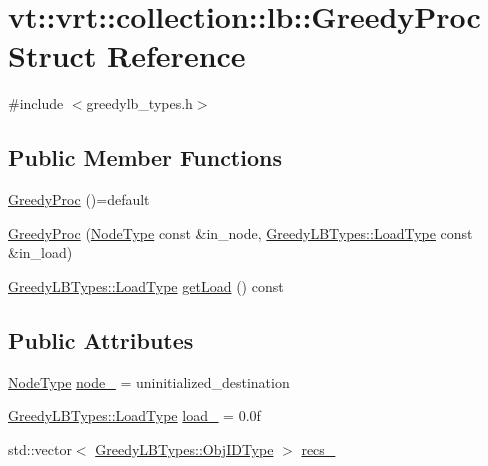 \hypertarget{structvt_1_1vrt_1_1collection_1_1lb_1_1_greedy_proc}{}\section{vt\+:\+:vrt\+:\+:collection\+:\+:lb\+:\+:Greedy\+Proc Struct Reference}
\label{structvt_1_1vrt_1_1collection_1_1lb_1_1_greedy_proc}


{\ttfamily \#include $<$greedylb\+\_\+types.\+h$>$}

\subsection*{Public Member Functions}
\begin{DoxyCompactItemize}
\item 
\hyperlink{structvt_1_1vrt_1_1collection_1_1lb_1_1_greedy_proc_acbbebf3b853047385b532825ae8f21fe}{Greedy\+Proc} ()=default
\item 
\hyperlink{structvt_1_1vrt_1_1collection_1_1lb_1_1_greedy_proc_a385378e718afd3f52760ebb179cfdb57}{Greedy\+Proc} (\hyperlink{namespacevt_a866da9d0efc19c0a1ce79e9e492f47e2}{Node\+Type} const \&in\+\_\+node, \hyperlink{structvt_1_1vrt_1_1collection_1_1lb_1_1_greedy_l_b_types_a9fe8829bc0c92e88ddf9d149233a54f4}{Greedy\+L\+B\+Types\+::\+Load\+Type} const \&in\+\_\+load)
\item 
\hyperlink{structvt_1_1vrt_1_1collection_1_1lb_1_1_greedy_l_b_types_a9fe8829bc0c92e88ddf9d149233a54f4}{Greedy\+L\+B\+Types\+::\+Load\+Type} \hyperlink{structvt_1_1vrt_1_1collection_1_1lb_1_1_greedy_proc_ab0c43e52a36b0afb41ca821970fd1d34}{get\+Load} () const
\end{DoxyCompactItemize}
\subsection*{Public Attributes}
\begin{DoxyCompactItemize}
\item 
\hyperlink{namespacevt_a866da9d0efc19c0a1ce79e9e492f47e2}{Node\+Type} \hyperlink{structvt_1_1vrt_1_1collection_1_1lb_1_1_greedy_proc_aad516b90985606d8d27ddd89e0109a6a}{node\+\_\+} = uninitialized\+\_\+destination
\item 
\hyperlink{structvt_1_1vrt_1_1collection_1_1lb_1_1_greedy_l_b_types_a9fe8829bc0c92e88ddf9d149233a54f4}{Greedy\+L\+B\+Types\+::\+Load\+Type} \hyperlink{structvt_1_1vrt_1_1collection_1_1lb_1_1_greedy_proc_a139e7722596ed8f891af1b16da8d8f3d}{load\+\_\+} = 0.\+0f
\item 
std\+::vector$<$ \hyperlink{structvt_1_1vrt_1_1collection_1_1lb_1_1_greedy_l_b_types_ae22670acd689e4ff83315fac2e4acb5e}{Greedy\+L\+B\+Types\+::\+Obj\+I\+D\+Type} $>$ \hyperlink{structvt_1_1vrt_1_1collection_1_1lb_1_1_greedy_proc_a601dd3243831370af2d1e791152902b3}{recs\+\_\+}
\end{DoxyCompactItemize}


